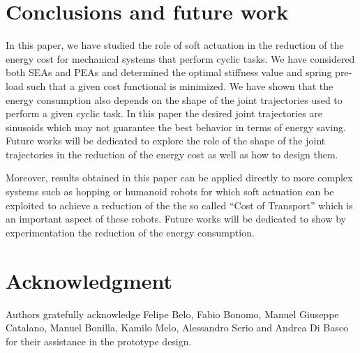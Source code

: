 \section{Conclusions and future work}

In this paper, we have studied the role of soft actuation in the reduction of the energy cost for mechanical systems that perform cyclic tasks. We have considered both SEAs and PEAs and determined the optimal stiffness value and spring pre-load such that a given cost functional is minimized. We have shown that the energy consumption also depends on the shape of the joint trajectories used to perform a given cyclic task. In this paper the desired joint trajectories are sinusoids which may not guarantee the best behavior in terms of energy saving. Future works will be dedicated to explore the role of the shape of the joint trajectories in the reduction of the energy cost as well as how to design them.

Moreover, results obtained in this paper can be applied directly to more complex systems such as hopping or humanoid robots for which soft actuation can be exploited to achieve a reduction of the the so called ``Cost of Transport'' which is an important aspect of these robots. Future works will be dedicated to show by experimentation the reduction of the energy consumption.

\section{Acknowledgment}
Authors gratefully acknowledge Felipe Belo, Fabio Bonomo, Manuel Giuseppe Catalano, Manuel Bonilla, Kamilo Melo, Alessandro Serio and Andrea Di Basco for their assistance in the prototype design.

